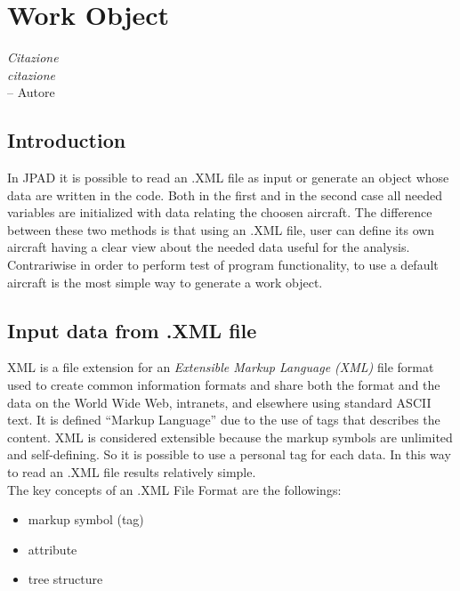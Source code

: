 \chapter{Work Object}%
\label{ch:workobject}

\begin{flushright}
	{\smaller
		\textit{Citazione\\ citazione}\\
		-- Autore}
\end{flushright}

\section {Introduction}
In JPAD it is possible to read an .XML file as input or generate an object whose data are written in the code. Both in the first and in the second case all needed variables are initialized with data relating the choosen aircraft. The difference between these two methods is that using an .XML file, user can define its own aircraft having a clear view about the needed data useful for the analysis.\\
Contrariwise in order to perform test of program functionality, to use a default aircraft is the most simple way to generate a work object.

\section {Input data from .XML file}
XML is a file extension for an {\itshape Extensible Markup Language (XML)} file format used to create common information formats and share both the format and the data on the World Wide Web, intranets, and elsewhere using standard ASCII text.
It is defined ``Markup Language'' due to the use of tags that describes the content. XML is considered extensible because the markup symbols are unlimited and self-defining. So it is possible to use a personal tag for each data. In this way to read an .XML file results relatively simple.\cite{wiki:xml}\\
The key concepts of an .XML File Format are the followings:
\begin{itemize}
\item markup symbol (tag)
\item attribute
\item tree structure
\end{itemize}

